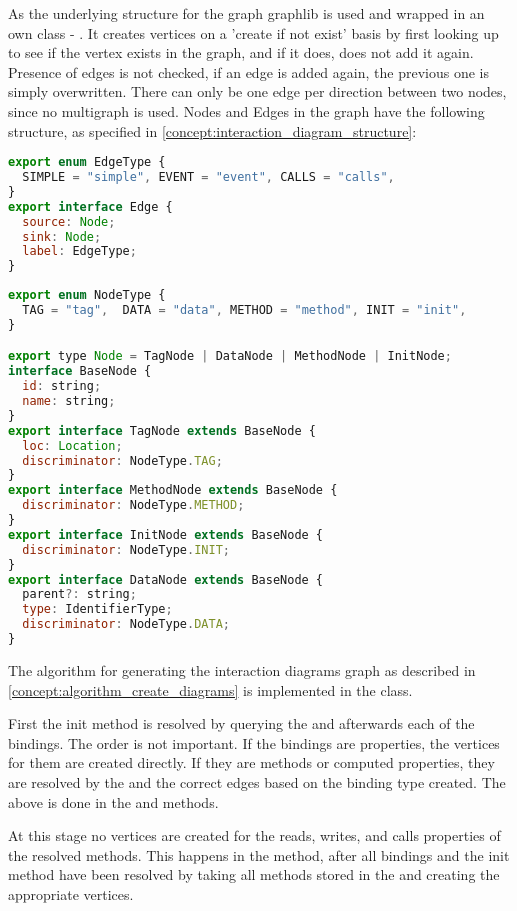 As the underlying structure for the graph graphlib is used and wrapped in an own class - . It creates vertices on a 'create if not exist' basis by first looking up to see if the vertex exists in the graph, and if it does, does not add it again. Presence of edges is not checked, if an edge is added again, the previous one is simply overwritten. There can only be one edge per direction between two nodes, since no multigraph is used. Nodes and Edges in the graph have the following structure, as specified in \ref{concept:interaction_diagram_structure}:

\begin{lstlisting}[language=JavaScript]
export enum EdgeType {
  SIMPLE = "simple", EVENT = "event", CALLS = "calls",
}
export interface Edge {
  source: Node;
  sink: Node;
  label: EdgeType;
}
\end{lstlisting}
\begin{lstlisting}[language=JavaScript]
export enum NodeType {
  TAG = "tag",  DATA = "data", METHOD = "method", INIT = "init",
}

export type Node = TagNode | DataNode | MethodNode | InitNode;
interface BaseNode {
  id: string;
  name: string;
}
export interface TagNode extends BaseNode {
  loc: Location;
  discriminator: NodeType.TAG;
}
export interface MethodNode extends BaseNode {
  discriminator: NodeType.METHOD;
}
export interface InitNode extends BaseNode {
  discriminator: NodeType.INIT;
}
export interface DataNode extends BaseNode {
  parent?: string;
  type: IdentifierType;
  discriminator: NodeType.DATA;
}
\end{lstlisting}


The algorithm for generating the interaction diagrams graph as described in \ref{concept:algorithm_create_diagrams}
is implemented in the  class.

First the init method is resolved by querying the  and afterwards each of the bindings. The order is not important. If the bindings are properties, the vertices for them are created directly. If they are methods or computed properties, they are resolved by the  and the correct edges based on the binding type created. The above is done in the  and  methods.

At this stage no vertices are created for the reads, writes, and calls properties of the resolved methods. 
This happens in the  method, after all bindings and the init method have been resolved by taking all methods stored in the  and creating the appropriate vertices.

